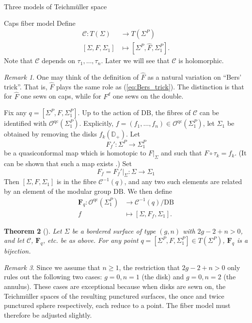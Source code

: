 \documentclass[12pt]{amsart}
\newcommand{\disk}{\ensuremath{\mathbb{D}} } %
\newcommand{\riem}{\Sigma}  %
\theoremstyle{plain}
\newtheorem{theorem}{Theorem}[section]
\theoremstyle{definition}
\theoremstyle{remark}
\newtheorem{remark}[theorem]{Remark}
\numberwithin{equation}{section} %
\numberwithin{figure}{section} %
\begin{document}
\begin{section}{Three models of Teichm\"uller space}
\begin{subsection}{Caps fiber model}
Define 
\begin{align} \label{eq:fibre_C_definition}
    \mathcal{C}:T(\riem) & \rightarrow T(\riem^P)  \nonumber \\
    [\riem,F,\riem_1] & \mapsto [\riem^P,\hat{F},\riem^P_1].
\end{align}
Note that $\mathcal{C}$ depends on $\tau_1,\ldots,\tau_n$.  Later we will see that $\mathcal{C}$ is holomorphic.

\begin{remark} \label{re:Bers_trick_extended}
 One may think of the definition of $\hat{F}$ as a natural variation on ``Bers' trick''. That is, $\hat{F}$ plays the same role as   (\ref{eq:Bers_trick}). The distinction is that for $\hat{F}$ one sews on caps, while for $F^d$ one sews on the double.
\end{remark}


Fix any $q=[\riem^P,F,\riem_1^P]$. Up to the action of $\mathrm{DB}$, the fibres of $\mathcal{C}$ can be identified with $\mathcal{O}^{\mathrm{qc}}(\riem^P_1)$.
Explicitly, $f=(f_1,\ldots,f_n) \in \mathcal{O}^{\mathrm{qc}}(\riem^P_1)$, let $\riem_1$ be obtained by removing the disks $f_k(\disk_+)$. 
Let
\begin{equation*}  
 F_f':\riem^P \rightarrow \riem_1^P 
\end{equation*}
be a quasiconformal map which is homotopic to $\left. F \right|_\riem$ and such that $F \circ \tau_k = f_k$.  (It can be shown that such a map exists \cite{RadnellSchippers_fiber}.)
Set 
\begin{equation} \label{eq:F_f_definition}
 F_f = \left. F_f' \right|_{\riem} : \riem \rightarrow \riem_1
\end{equation} 
Then $[\riem,F,\riem_1]$ is in the fibre $\mathcal{C}^{-1}(q)$, and any two such elements are related by an element of the modular group $\mathrm{DB}$.
We then define 
\begin{align} \label{eq:fibre_F_definition}
  \mathbf{F}_q:\mathcal{O}^{\mathrm{qc}}(\riem_1^P) & \rightarrow \mathcal{C}^{-1}(q)/\mathrm{DB}  \nonumber \\
  f & \mapsto [\riem,F_f,\riem_1]. 
\end{align}
\begin{theorem}[\cite{RadnellSchippers_fiber}] \label{th:Fq_is_bijection} Let $\riem$ be a bordered surface of type $(g,n)$ with $2g-2+n>0$, and let $\mathcal{C}$, $\mathbf{F}_q$, etc. be as above.  
   For any point $q=[\riem^P,F,\riem_1^P] \in T(\riem^P)$, $\mathbf{F}_q$ is a bijection.
\end{theorem}
\begin{remark} \label{re:fiber_exceptional_cases}
  Since we assume that $n \geq 1$, the restriction that $2g-2+n>0$ only rules out the following two cases: $g=0, n=1$ (the disk) and $g=0,n=2$ (the annulus). These cases are exceptional because when disks are sewn on, the Teichm\"uller spaces of the resulting punctured surfaces, the once and twice punctured sphere respectively, each reduce to a point. The fiber model must therefore be adjusted slightly.
  

\end{remark}
\end{subsection}
\end{section}
\end{document}
